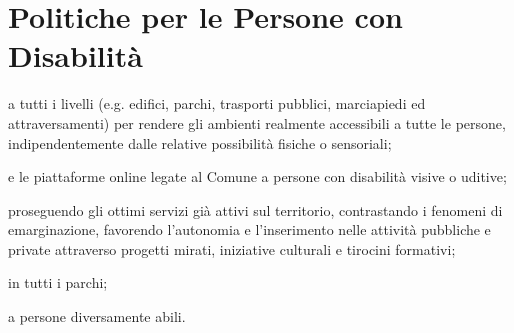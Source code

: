 \section{Politiche per le Persone con Disabilità}
 a tutti i livelli (e.g. edifici, parchi, trasporti pubblici, marciapiedi ed attraversamenti) per rendere gli ambienti realmente accessibili a tutte le persone, indipendentemente dalle relative possibilità fisiche o sensoriali;

 e le piattaforme online legate al Comune a persone con disabilità visive o uditive;

 proseguendo gli ottimi servizi già attivi sul territorio, contrastando i fenomeni di emarginazione, favorendo l'autonomia e l'inserimento nelle attività pubbliche e private attraverso progetti mirati, iniziative culturali e tirocini formativi;

 in tutti i parchi;

 a persone diversamente abili.
